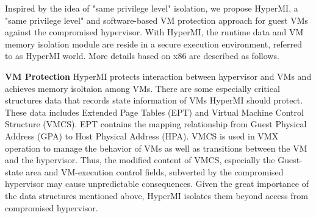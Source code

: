 \documentclass[conference]{IEEEtran}
\begin{document}
Inspired by the idea of "same privilege level" isolation, we propose HyperMI, a "same privilege level" and software-based VM protection approach for guest VMs against the compromised hypervisor. 
With HyperMI, the runtime data and VM memory isolation module are reside in a secure execution environment, referred to as HyperMI world.
More details based on x86 are described as follows.

\textbf{VM Protection}
HyperMI protects interaction between hypervisor and VMs and achieves memory isoltaion among VMs. 
There are some especially critical structures data that records state information of VMs HyperMI should protect. These data includes Extended Page Tables (EPT) and Virtual Machine Control Structure (VMCS). EPT contains the mapping relationship from Guest Physical Address (GPA) to Host Physical Address (HPA). 
VMCS is used in VMX operation to manage the behavior of VMs as well as transitions between the VM and the hypervisor. Thus, the modified content of VMCS, especially the Guest-state area and VM-execution control fields, subverted by the compromised hypervisor may cause unpredictable consequences.%
Given the great importance of the data structures mentioned above, HyperMI isolates them beyond access from compromised hypervisor.
\end{document}
